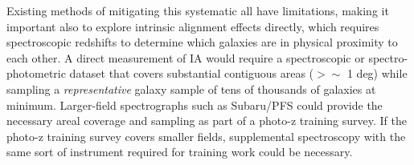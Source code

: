Existing methods of mitigating this systematic all have limitations, making it important also to explore intrinsic alignment effects directly, which requires spectroscopic redshifts to determine
which galaxies are in physical proximity to each other.
A direct measurement of IA would require a spectroscopic or spectro-photometric dataset that covers substantial
contiguous areas ($>\sim$ 1 deg) while sampling a
{\em representative} galaxy sample of tens of thousands of galaxies at minimum.
Larger-field spectrographs such as Subaru/PFS could provide the necessary areal coverage and sampling as part of a photo-z training survey.  If the photo-z training survey covers smaller fields, supplemental spectroscopy with the same sort of instrument required for training work could be necessary.

